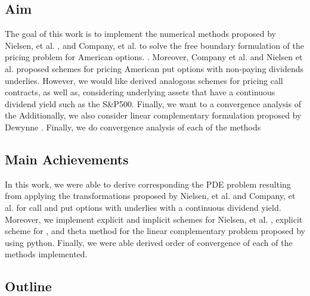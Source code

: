\subsection{Aim} 

The goal of this work is to implement the numerical methods proposed by 
Nielsen, et al. \cite{nielsen_2001}, and Company, et al. \cite{company_egorova_jodar_2014} to solve the free boundary formulation of the pricing problem for American options. \cite*{dewynne_howison_rupf_wilmott_1993}. Moreover, Company et al. \cite*{company_egorova_jodar_2014} and Nielsen et al. \cite*{nielsen_2001} proposed schemes for pricing American put options with non-paying dividends underlies. However, we would like derived analogous schemes for pricing call contracts, as well as, considering underlying assets that have a continuous dividend yield such as the S\&P500. Finally, we want to a convergence analysis of the 
Additionally, we also consider linear complementary formulation proposed by Dewynne \cite{dewynne_howison_rupf_wilmott_1993} \cite{wilmott_howison_dewynne_1995}. Finally, we do convergence analysis of each of the methods

\subsection{Main Achievements}

In this work, we were able to derive corresponding the PDE problem resulting from applying the transformations proposed by Nielsen, et al. \cite{nielsen_2001} and Company, et al. \cite{company_egorova_jodar_2014} for call and put options with underlies with a continuous dividend yield. Moreover, we implement explicit and implicit schemes for Nielsen, et al. \cite{nielsen_2001}, explicit scheme for \cite{company_egorova_jodar_2014}, and theta method for the linear complementary problem proposed by \cite{wilmott_howison_dewynne_1995} using python. Finally, we were able derived order of convergence of each of the methods implemented.

\subsection{Outline}

